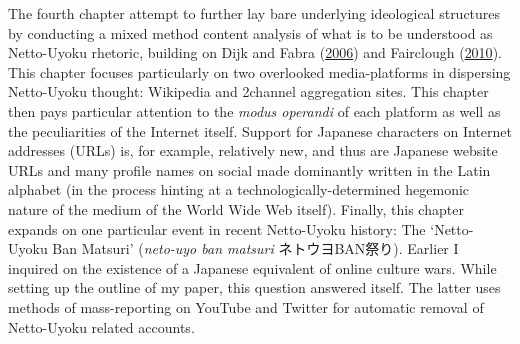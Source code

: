 \documentclass[10pt,british,A4paper,,openany]{memoir}
\begin{document}
The fourth chapter attempt to further lay bare underlying ideological
structures by conducting a mixed method content analysis of what is to
be understood as Netto-Uyoku rhetoric, building on Dijk and Fabra
(\protect\hyperlink{ref-van_dijk_politics_2006}{2006}) and Fairclough
(\protect\hyperlink{ref-fairclough_media_2010}{2010}). This chapter
focuses particularly on two overlooked media-platforms in dispersing
Netto-Uyoku thought: Wikipedia and 2channel aggregation sites. This
chapter then pays particular attention to the \emph{modus operandi} of
each platform as well as the peculiarities of the Internet itself.
Support for Japanese characters on Internet addresses (URLs) is, for
example, relatively new, and thus are Japanese website URLs and many
profile names on social made dominantly written in the Latin alphabet
(in the process hinting at a technologically-determined hegemonic nature
of the medium of the World Wide Web itself). Finally, this chapter
expands on one particular event in recent Netto-Uyoku history: The
`Netto-Uyoku Ban Matsuri' (\emph{neto-uyo ban matsuri} ネトウヨBAN祭り).
Earlier I inquired on the existence of a Japanese equivalent of online
culture wars. While setting up the outline of my paper, this question
answered itself. The latter uses methods of mass-reporting on YouTube
and Twitter for automatic removal of Netto-Uyoku related accounts.
\end{document}
